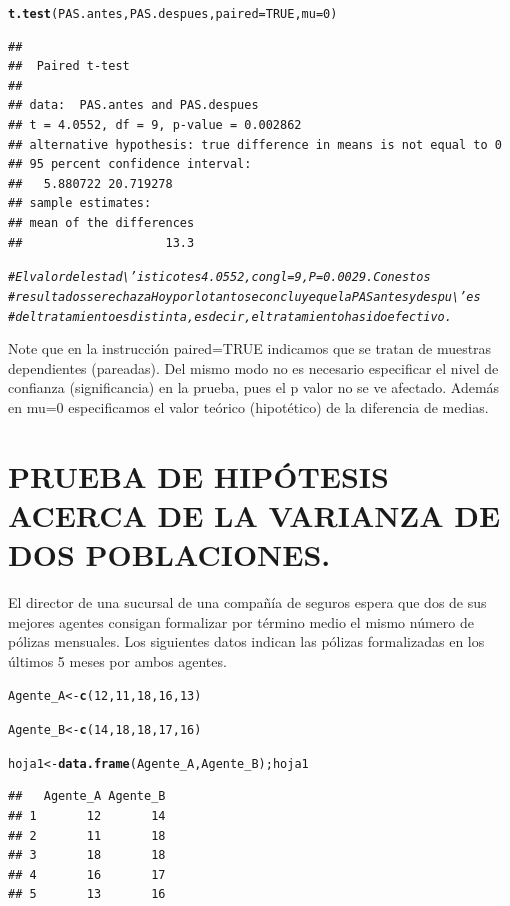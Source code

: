 \documentclass[12pt,letterpaper]{article}\usepackage[]{graphicx}\usepackage[]{color}
\makeatletter
\newcommand{\hlnum}[1]{\textcolor[rgb]{0.686,0.059,0.569}{#1}}%
\newcommand{\hlcom}[1]{\textcolor[rgb]{0.678,0.584,0.686}{\textit{#1}}}%
\newcommand{\hlstd}[1]{\textcolor[rgb]{0.345,0.345,0.345}{#1}}%
\newcommand{\hlkwb}[1]{\textcolor[rgb]{0.69,0.353,0.396}{#1}}%
\newcommand{\hlkwc}[1]{\textcolor[rgb]{0.333,0.667,0.333}{#1}}%
\newcommand{\hlkwd}[1]{\textcolor[rgb]{0.737,0.353,0.396}{\textbf{#1}}}%
\newenvironment{kframe}{%
 \def\at@end@of@kframe{}%
 \ifinner\ifhmode%
  \def\at@end@of@kframe{\end{minipage}}%
  \begin{minipage}{\columnwidth}%
 \fi\fi%
 \def\FrameCommand##1{\hskip\@totalleftmargin \hskip-\fboxsep
 \colorbox{shadecolor}{##1}\hskip-\fboxsep
     \hskip-\linewidth \hskip-\@totalleftmargin \hskip\columnwidth}%
 \MakeFramed {\advance\hsize-\width
   \@totalleftmargin\z@ \linewidth\hsize
   \@setminipage}}%
 {\par\unskip\endMakeFramed%
 \at@end@of@kframe}
\newenvironment{knitrout}{}{} %
\makeatother
\begin{document}
\begin{knitrout}
\begin{kframe}
\begin{alltt}
\hlkwd{t.test}\hlstd{(PAS.antes, PAS.despues,} \hlkwc{paired}\hlstd{=}\hlnum{TRUE}\hlstd{,} \hlkwc{mu}\hlstd{=}\hlnum{0}\hlstd{)}
\end{alltt}
\begin{verbatim}
## 
## 	Paired t-test
## 
## data:  PAS.antes and PAS.despues
## t = 4.0552, df = 9, p-value = 0.002862
## alternative hypothesis: true difference in means is not equal to 0
## 95 percent confidence interval:
##   5.880722 20.719278
## sample estimates:
## mean of the differences 
##                    13.3
\end{verbatim}
\begin{alltt}
\hlcom{# El valor del estad\textbackslash{}'istico t es 4.0552, con gl = 9, P = 0.0029. Con estos }
\hlcom{# resultados se rechaza Ho y por lo tanto se concluye que la PAS antes y despu\textbackslash{}'es }
\hlcom{# del tratamiento es distinta, es decir, el tratamiento ha sido efectivo. }
\end{alltt}
\end{kframe}
\end{knitrout}

Note que en la instrucci\'on paired=TRUE indicamos que se tratan de muestras dependientes 
(pareadas). Del mismo modo no es necesario especificar el nivel de confianza (significancia) en la prueba, pues el p valor no se ve afectado. Adem\'as en mu=0 especificamos el valor te\'orico (hipot\'etico) de la diferencia de medias.\\


\section{PRUEBA DE HIP\'OTESIS ACERCA DE LA VARIANZA DE DOS POBLACIONES.}


El director de una sucursal de una compa\~nía de seguros espera que dos de sus mejores agentes consigan formalizar por t\'ermino medio el mismo número de p\'olizas mensuales. Los siguientes datos indican las p\'olizas formalizadas en los \'ultimos 5 meses por ambos agentes. 

\begin{knitrout}
\color{fgcolor}\begin{kframe}
\begin{alltt}
\hlstd{Agente_A} \hlkwb{<-} \hlkwd{c}\hlstd{(}\hlnum{12}\hlstd{,} \hlnum{11}\hlstd{,} \hlnum{18}\hlstd{,} \hlnum{16}\hlstd{,} \hlnum{13}\hlstd{)}

\hlstd{Agente_B} \hlkwb{<-} \hlkwd{c}\hlstd{(}\hlnum{14}\hlstd{,} \hlnum{18}\hlstd{,} \hlnum{18}\hlstd{,} \hlnum{17}\hlstd{,} \hlnum{16}\hlstd{)}

\hlstd{hoja1} \hlkwb{<-} \hlkwd{data.frame}\hlstd{(Agente_A, Agente_B); hoja1}
\end{alltt}
\begin{verbatim}
##   Agente_A Agente_B
## 1       12       14
## 2       11       18
## 3       18       18
## 4       16       17
## 5       13       16
\end{verbatim}
\end{kframe}
\end{knitrout}
\end{document}
